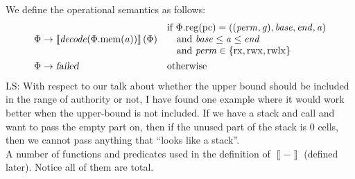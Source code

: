 \documentclass[a4paper]{article}
\newcommand{\sem}[1]{\left\llbracket #1 \right\rrbracket}
\newcommand\lau[1]{{\color{purple} \sf \footnotesize {LS: #1}}\\}
\newcommand{\var}[1]{\mathit{#1}}
\newcommand{\gl}{\var{g}}
\newcommand{\pcreg}{\mathrm{pc}}
\newcommand{\addr}{\var{a}}
\newcommand{\start}{\var{base}}
\newcommand{\addrend}{\var{end}}
\newcommand{\perm}{\var{perm}}
\newcommand{\stdcap}[1][(\perm,\gl)]{\left(#1,\start,\addrend,\addr \right)}
\newcommand{\plainproj}[1]{\mathrm{#1}}
\newcommand{\memheap}[1][\Phi]{#1.\plainproj{mem}}
\newcommand{\memreg}[1][\Phi]{#1.\plainproj{reg}}
\newcommand{\failed}{\textsl{failed}}
\newcommand{\plainfun}[2]{
  \ifthenelse{\equal{#2}{}}
  {\mathit{#1}}
  {\mathit{#1}(#2)}
}
\newcommand{\decode}{\plainfun{decode}{}}
\newcommand{\plainperm}[1]{\mathrm{#1}}
\newcommand{\exec}{\plainperm{rx}}
\newcommand{\rwx}{\plainperm{rwx}}
\newcommand{\rwlx}{\plainperm{rwlx}}
\begin{document}
We define the operational semantics as follows:
\begin{align*}
  \Phi & \rightarrow \sem{\decode(\memheap(\addr))}(\Phi) & &                                   
                                                              \arraycolsep=0pt
                                                              \begin{array}{l}
                                                                \text{if $\memreg(\pcreg) = \stdcap$}\\
                                                                \quad\text{and $\start \leq \addr \leq \addrend$}\\
                                                                \quad\text{and $\perm \in \{ \exec,\rwx, \rwlx \}$ }
                                                              \end{array}\\
  \Phi & \rightarrow \failed                                 & & \text{otherwise}
\end{align*}
\lau{With respect to our talk about whether the upper bound should be included in the range of authority or not, I have found one example where it would work better when the upper-bound is not included. If we have a stack and call and want to pass the empty part on, then if the unused part of the stack is 0 cells, then we cannot pass anything that ``looks like a stack''.}
A number of functions and predicates used in the definition of $\sem{-}$ (defined later). Notice all of them are total.
\end{document}
